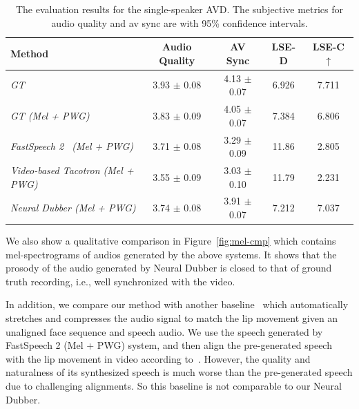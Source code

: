 \documentclass{article}
\begin{document}
\begin{table}[htbp]
	\centering
	\small
	\begin{tabular}{ l | c | c || c | c }
		\toprule
		\textbf{Method} &  \textbf{Audio Quality} & \textbf{AV Sync} & \textbf{LSE-D}  & \textbf{LSE-C} $\uparrow$\\ 
		\midrule
		\textit{GT} & 3.93 $\pm$ 0.08 & 4.13 $\pm$ 0.07 & 6.926 & 7.711\\
	    \textit{GT (Mel + PWG)} & 3.83 $\pm$ 0.09 & 4.05 $\pm$ 0.07 & 7.384 & 6.806\\
	    \midrule
	    \textit{FastSpeech 2~\cite{ren2021fastspeech} (Mel + PWG)} & 3.71 $\pm$ 0.08 & 3.29 $\pm$ 0.09 & 11.86 & 2.805\\
		\midrule 
		\textit{Video-based Tacotron
		(Mel + PWG)} & 3.55 $\pm$ 0.09 & 3.03 $\pm$ 0.10 & 11.79 & 2.231\\
		\textit{Neural Dubber (Mel + PWG)} & 3.74 $\pm$ 0.08 & 3.91 $\pm$ 0.07 & 7.212 & 7.037\\
		\bottomrule
	\end{tabular}
	\vspace{0.3cm}
	\caption{
	The evaluation results for the single-speaker AVD. The subjective metrics for audio quality and av sync are with 95\% confidence intervals.
    }
	\label{tab:single_svd}
	\vspace{-0.5cm}
\end{table}

We also show a qualitative comparison in Figure~\ref{fig:mel-cmp} which contains mel-spectrograms of audios generated by the above systems. It shows that the prosody of the audio generated by Neural Dubber is closed to that of ground truth recording, i.e., well synchronized with the video. 

In addition, we compare our method with another baseline~\cite{halperin2019dynamic} which automatically stretches and compresses the audio signal to match the lip movement given an unaligned face sequence and speech audio. We use the speech generated by FastSpeech 2 (Mel + PWG) system, and then align the pre-generated speech with the lip movement in video according to~\cite{halperin2019dynamic}. However, the quality and naturalness of its synthesized speech is much worse than the pre-generated speech due to challenging alignments. So this baseline is not comparable to our Neural Dubber.
\end{document}
